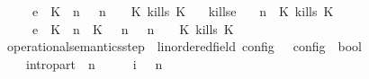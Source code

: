 \begin{isabellebody}
\ \ \ \ \ {\isasymhookrightarrow}\isactrlsub e\ \ {\isacharparenleft}{\isacharparenleft}{\isacharparenleft}K\ {\isasymnot}{\isasymUp}\ n{\isacharparenright}\ {\isacharhash}\ {\isasymGamma}{\isacharparenright}{\isacharcomma}\ n\ {\isasymturnstile}\ {\isasymPsi}\ {\isasymtriangleright}\ {\isacharparenleft}{\isacharparenleft}K\ kills\ K\ {\isacharhash}\ {\isasymPhi}{\isacharparenright}{\isacharparenright}{\isachardoublequoteclose}\isanewline
{\isacharbar}\ kills{\isacharunderscore}e{}{\isacharcolon}\isanewline
\ \ {\isachardoublequoteopen}{\isacharparenleft}{\isasymGamma}{\isacharcomma}\ n\ {\isasymturnstile}\ {\isacharparenleft}{\isacharparenleft}K\ kills\ K\ {\isacharhash}\ {\isasymPsi}{\isacharparenright}\ {\isasymtriangleright}\ {\isasymPhi}{\isacharparenright}\isanewline
\ \ \ \ \ {\isasymhookrightarrow}\isactrlsub e\ \ {\isacharparenleft}{\isacharparenleft}{\isacharparenleft}K\ {\isasymUp}\ n{\isacharparenright}\ {\isacharhash}\ {\isacharparenleft}K\ {\isasymnot}{\isasymUp}\ {\isasymge}\ n{\isacharparenright}\ {\isacharhash}\ {\isasymGamma}{\isacharparenright}{\isacharcomma}\ n\ {\isasymturnstile}\ {\isasymPsi}\ {\isasymtriangleright}\ {\isacharparenleft}{\isacharparenleft}K\ kills\ K\ {\isacharhash}\ {\isasymPhi}{\isacharparenright}{\isacharparenright}{\isachardoublequoteclose}\isanewline
\isanewline
{}\isamarkupfalse%
\ operational{\isacharunderscore}semantics{\isacharunderscore}step\ {\isacharcolon}{\isacharcolon}\ {\isachardoublequoteopen}{\isacharparenleft}{\isacharprime}{\isasymtau}{\isacharcolon}{\isacharcolon}linordered{\isacharunderscore}field{\isacharparenright}\ config\ {\isasymRightarrow}\ {\isacharprime}{\isasymtau}\ config\ {\isasymRightarrow}\ bool{\isachardoublequoteclose}\ {\isacharparenleft}{\isachardoublequoteopen}{\isacharunderscore}\ {\isasymhookrightarrow}\ {\isacharunderscore}{\isachardoublequoteclose}\ {}{}{\isacharparenright}\ \isanewline
\ \ \ \ intro{\isacharunderscore}part{\isacharcolon}\ {\isachardoublequoteopen}{\isacharparenleft}{\isasymGamma}\ n\ {\isasymturnstile}\ {\isasymPsi}\ {\isasymtriangleright}\ {\isasymPhi}\ \ {\isasymhookrightarrow}\isactrlsub i\ \ {\isacharparenleft}{\isasymGamma}\ n\ {\isasymturnstile}\ {\isasymPsi}\ {\isasymtriangleright}\ {\isasymPhi}\isanewline

\end{isabellebody}
